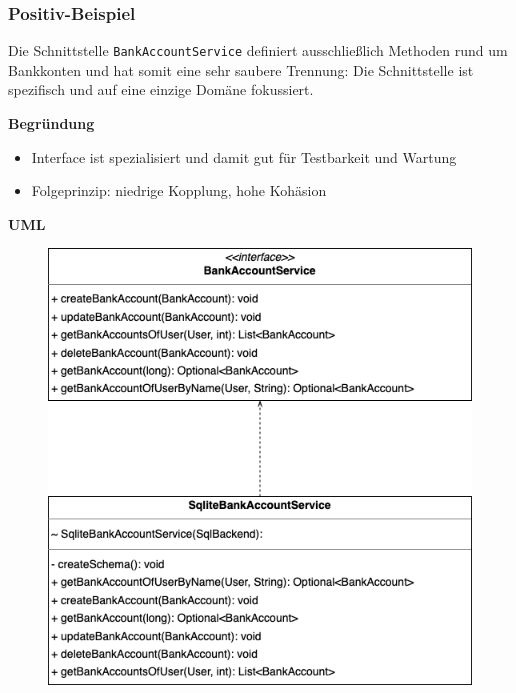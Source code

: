 \subsubsection*{Positiv-Beispiel}
Die Schnittstelle \texttt{BankAccountService} definiert ausschließlich Methoden rund um Bankkonten und hat somit eine sehr saubere Trennung: Die Schnittstelle ist spezifisch und auf eine einzige Domäne fokussiert.

\textbf{Begründung}
\begin{itemize}
    \item Interface ist spezialisiert und damit gut für Testbarkeit und Wartung
    \item Folgeprinzip: niedrige Kopplung, hohe Kohäsion
\end{itemize}
\textbf{UML}
\begin{figure}[htbp]
    \centering
    \includegraphics[width=0.65\linewidth]{kapitel3_solid/ISP_positive_BankAccountService.drawio.png}
\end{figure}

